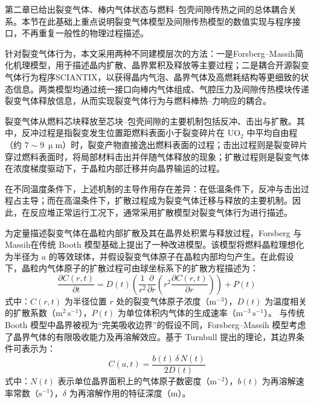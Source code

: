 第二章已给出裂变气体、棒内气体状态与燃料--包壳间隙传热之间的总体耦合关系。本节在此基础上重点说明裂变气体模型及间隙传热模型的数值实现与程序接口，不再重复一般性的物理过程描述。

针对裂变气体行为，本文采用两种不同建模层次的方法：一是Forsberg--Massih简化机理模型，用于描述晶内扩散、晶界累积及释放等主要过程；二是耦合开源裂变气体行为程序SCIANTIX，以获得晶内气泡、晶界气体及高燃耗结构等更细致的状态信息。两类模型均通过统一接口向棒内气体组成、气腔压力及间隙传热模块传递裂变气体释放信息，从而实现裂变气体行为与燃料棒热--力响应的耦合。


裂变气体从燃料芯块释放至芯块--包壳间隙的主要机制包括反冲、击出与扩散。其中，反冲过程是指裂变发生位置距燃料表面小于裂变碎片在 $\mathrm{UO_2}$ 中平均自由程（约 $7\sim9~\upmu\mathrm{m}$）时，裂变产物直接逸出燃料表面的过程；击出过程则是裂变碎片穿过燃料表面时，将局部材料击出并伴随气体释放的现象；扩散过程则是裂变气体在浓度梯度驱动下，于晶粒内部迁移并向晶界输运的过程。

在不同温度条件下，上述机制的主导作用存在差异：在低温条件下，反冲与击出过程占主导；而在高温条件下，扩散过程成为裂变气体迁移与释放的主要机制。因此，在反应堆正常运行工况下，通常采用扩散模型对裂变气体行为进行描述。

为定量描述裂变气体在晶粒内部扩散及其在晶界处积累与释放过程，Forsberg 与 Massih\cite{forsbergDiffusionTheoryFission1985}在传统 Booth 模型基础上提出了一种改进模型。该模型将燃料晶粒理想化为半径为 $a$ 的等效球体，并假设裂变气体原子在晶粒内部均匀产生。在此假设下，晶粒内气体原子的扩散过程可由球坐标系下的扩散方程描述为：
\begin{equation}
	\frac{\partial C(r,t)}{\partial t}
	= D(t)\left(\frac{1}{r^2}\frac{\partial}{\partial r}\left(r^2 \frac{\partial C(r,t)}{\partial r}\right)\right)
	+ P(t)
\end{equation}
\noindent 式中：$C(r,t)$ 为半径位置 $r$ 处的裂变气体原子浓度（$\mathrm{m^{-3}}$），$D(t)$ 为温度相关的扩散系数（$\mathrm{m^2\,s^{-1}}$），$P(t)$ 为单位体积内气体的生成速率（$\mathrm{m^{-3}\,s^{-1}}$）。
与传统 Booth 模型中晶界被视为“完美吸收边界”的假设不同，Forsberg--Massih 模型考虑了晶界气体的有限吸收能力及再溶解效应。基于 Turnbull 提出的理论，其边界条件可表示为：
\begin{equation}
	C(a,t) = \frac{b(t)\,\delta\,N(t)}{2D(t)}
\end{equation}
\noindent 式中：$N(t)$ 表示单位晶界面积上的气体原子数密度（$\mathrm{m^{-2}}$），$b(t)$ 为再溶解速率常数（$\mathrm{s^{-1}}$），$\delta$ 为再溶解作用的特征深度（$\mathrm{m}$）。

